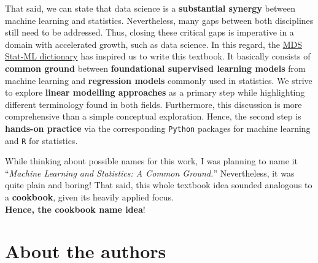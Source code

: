\documentclass[
  letterpaper,
  DIV=11,
  numbers=noendperiod]{scrreprt}
\begin{document}
That said, we can state that data science is a \textbf{substantial
synergy} between machine learning and statistics. Nevertheless, many
gaps between both disciplines still need to be addressed. Thus, closing
these critical gaps is imperative in a domain with accelerated growth,
such as data science. In this regard, the
\href{https://ubc-mds.github.io/resources_pages/terminology/}{MDS
Stat-ML dictionary} has inspired us to write this textbook. It basically
consists of \textbf{common ground} between \textbf{foundational
supervised learning models} from machine learning and \textbf{regression
models} commonly used in statistics. We strive to explore \textbf{linear
modelling approaches} as a primary step while highlighting different
terminology found in both fields. Furthermore, this discussion is more
comprehensive than a simple conceptual exploration. Hence, the second
step is \textbf{hands-on practice} via the corresponding \texttt{Python}
packages for machine learning and \texttt{R} for statistics.

\begin{tcolorbox}[enhanced jigsaw, bottomrule=.15mm, breakable, colback=white, leftrule=.75mm, coltitle=black, rightrule=.15mm, bottomtitle=1mm, title={Fun fact!}, opacitybacktitle=0.6, toprule=.15mm, titlerule=0mm, arc=.35mm, colbacktitle=quarto-callout-warning-color!10!white, toptitle=1mm, colframe=quarto-callout-warning-color-frame, left=2mm, opacityback=0]

While thinking about possible names for this work, I was planning to
name it ``\emph{Machine Learning and Statistics: A Common Ground.}''
Nevertheless, it was quite plain and boring! That said, this whole
textbook idea sounded analogous to a \textbf{cookbook}\footnotemark{},
given its heavily applied focus.\\

\textbf{Hence, the cookbook name idea}!

\end{tcolorbox}


\section*{About the authors}\label{about-the-authors}

\end{document}
